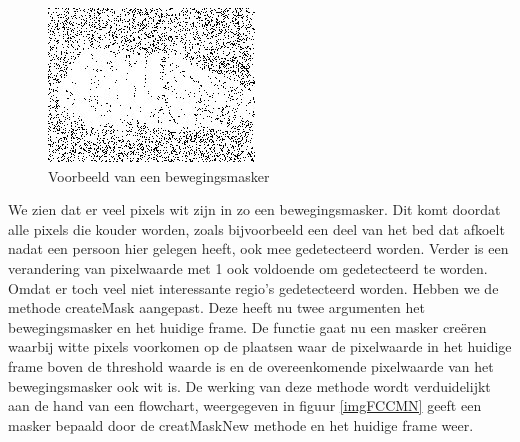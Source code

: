 \begin{figure}[hbp]
	\includegraphics[scale=0.75]{bewegingsMatrix}
	\caption{Voorbeeld van een bewegingsmasker}
	\label{imgBMa}
\end{figure}
We zien dat er veel pixels wit zijn in zo een bewegingsmasker. Dit komt doordat alle pixels die kouder worden, zoals bijvoorbeeld een deel van het bed dat afkoelt nadat een persoon hier gelegen heeft, ook mee gedetecteerd worden. Verder is een verandering van pixelwaarde met 1 ook voldoende om gedetecteerd te worden. Omdat er toch veel niet interessante regio's gedetecteerd worden. Hebben we de methode createMask aangepast. Deze heeft nu twee argumenten het bewegingsmasker en het huidige frame. De functie gaat nu een masker cre\"eren waarbij witte pixels voorkomen op de plaatsen waar de pixelwaarde in het huidige frame boven de threshold waarde is en de overeenkomende pixelwaarde van het bewegingsmasker ook wit is. De werking van deze methode wordt verduidelijkt aan de hand van een flowchart, weergegeven in figuur \ref{imgFCCMN} geeft een masker bepaald door de creatMaskNew methode en het huidige frame weer.
